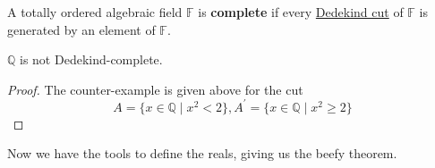   \begin{definition}
    \label{def:dedekind-completeness}
    A totally ordered algebraic field $\mathbb{F}$ is \textbf{complete} if every \hyperref[def:dedekind-cut]{Dedekind cut} of $\mathbb{F}$ is generated by an element of $\mathbb{F}$. 
  \end{definition} 

  \begin{theorem}
    \label{thm:rationals-are-not-dedekind-complete}
    $\mathbb{Q}$ is not Dedekind-complete. 
  \end{theorem}
  \begin{proof}
    The counter-example is given above for the cut 
    \begin{equation}
      A = \{x \in \mathbb{Q} \mid x^2 < 2 \}, A^\prime = \{x \in \mathbb{Q} \mid x^2 \geq 2 \}
    \end{equation}
  \end{proof} 

  Now we have the tools to define the reals, giving us the beefy theorem. 

